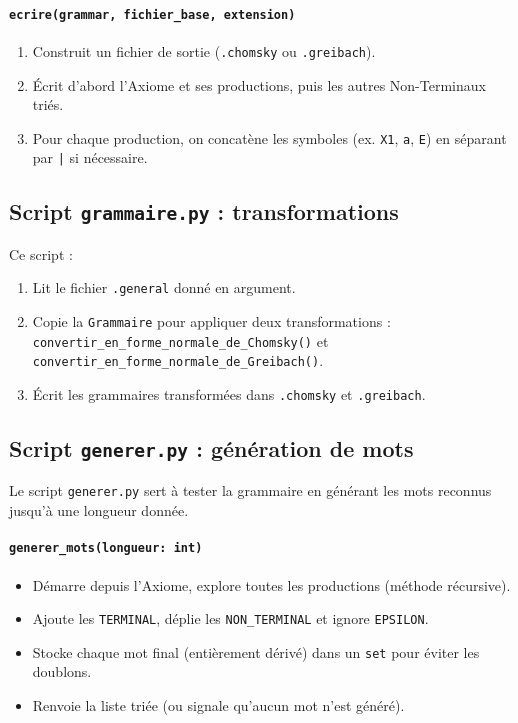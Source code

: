 \documentclass[a4paper,12pt]{article}
\begin{document}
\paragraph{\texttt{ecrire(grammar, fichier\_base, extension)}} 
\begin{enumerate}
    \item Construit un fichier de sortie (\texttt{.chomsky} ou \texttt{.greibach}).
    \item Écrit d’abord l’Axiome et ses productions, puis les autres Non-Terminaux triés.
    \item Pour chaque production, on concatène les symboles (ex. \texttt{X1}, \texttt{a}, \texttt{E}) en séparant par \texttt{|} si nécessaire.
\end{enumerate}

\subsection{Script \texttt{grammaire.py} : transformations}
\label{subsec:grammaire-py}

Ce script :
\begin{enumerate}
    \item Lit le fichier \texttt{.general} donné en argument.
    \item Copie la \texttt{Grammaire} pour appliquer deux transformations : \texttt{convertir\_en\_forme\_normale\_de\_Chomsky()} et \texttt{convertir\_en\_forme\_normale\_de\_Greibach()}.
    \item Écrit les grammaires transformées dans \texttt{.chomsky} et \texttt{.greibach}.
\end{enumerate}

\subsection{Script \texttt{generer.py} : génération de mots}
\label{subsec:generer-py}

Le script \texttt{generer.py} sert à tester la grammaire en générant les mots reconnus jusqu’à une longueur donnée.

\paragraph{\texttt{generer\_mots(longueur: int)}} 
\begin{itemize}
    \item Démarre depuis l’Axiome, explore toutes les productions (méthode récursive).
    \item Ajoute les \texttt{TERMINAL}, déplie les \texttt{NON\_TERMINAL} et ignore \texttt{EPSILON}.
    \item Stocke chaque mot final (entièrement dérivé) dans un \texttt{set} pour éviter les doublons.
    \item Renvoie la liste triée (ou signale qu’aucun mot n’est généré).
\end{itemize}
\end{document}
